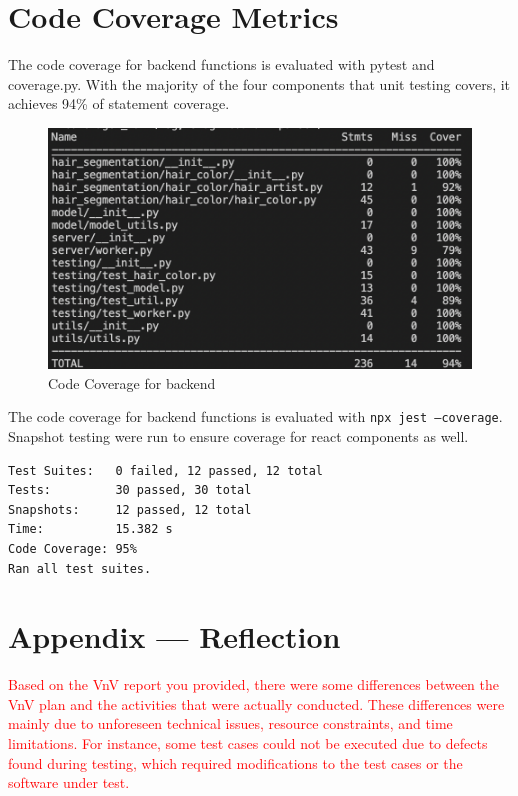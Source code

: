 \documentclass[12pt, oneside, openany, titlepage]{article}
\begin{document}
\section{Code Coverage Metrics}

The code coverage for backend functions is evaluated with pytest and coverage.py. With the majority of the four components that unit testing covers, it achieves 94\% of statement coverage.

\begin{figure}[h]
  \centering
  \includegraphics[width=0.8\linewidth]{VnVReport/be_cover.png}
  \caption{Code Coverage for backend}
\end{figure}

\newline
\noindent The code coverage for backend functions is evaluated with \texttt{npx jest --coverage}. Snapshot testing were run to ensure coverage for react components as well. \\
\begin{verbatim}
Test Suites:   0 failed, 12 passed, 12 total
Tests:         30 passed, 30 total
Snapshots:     12 passed, 12 total
Time:          15.382 s
Code Coverage: 95%
Ran all test suites.
\end{verbatim}





\newpage{}
\section{Appendix --- Reflection}

\textcolor{red}{Based on the VnV report you provided, there were some differences between the VnV plan and the activities that were actually conducted. These differences were mainly due to unforeseen technical issues, resource constraints, and time limitations. For instance, some test cases could not be executed due to defects found during testing, which required modifications to the test cases or the software under test.}
\end{document}
